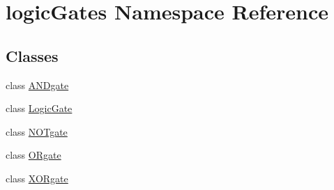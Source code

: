 \hypertarget{namespacelogic_gates}{}\section{logic\+Gates Namespace Reference}
\label{namespacelogic_gates}
\subsection*{Classes}
\begin{DoxyCompactItemize}
\item 
class \hyperlink{classlogic_gates_1_1_a_n_dgate}{A\+N\+Dgate}
\item 
class \hyperlink{classlogic_gates_1_1_logic_gate}{Logic\+Gate}
\item 
class \hyperlink{classlogic_gates_1_1_n_o_tgate}{N\+O\+Tgate}
\item 
class \hyperlink{classlogic_gates_1_1_o_rgate}{O\+Rgate}
\item 
class \hyperlink{classlogic_gates_1_1_x_o_rgate}{X\+O\+Rgate}
\end{DoxyCompactItemize}
